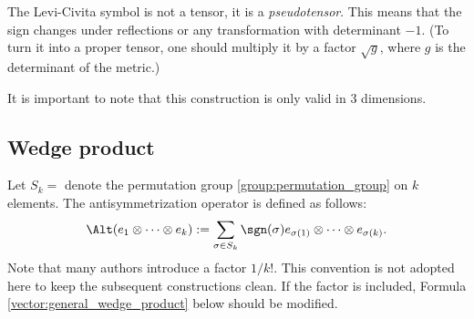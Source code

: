     \begin{remark}[Pseudotensor]\label{vector:levi_civita_pseudotensor}
        The Levi-Civita symbol is not a tensor, it is a \textit{pseudotensor}. This means that the sign changes under reflections or any transformation with determinant $-1$. (To turn it into a proper tensor, one should multiply it by a factor $\sqrt{g}$, where $g$ is the determinant of the metric.)
    \end{remark}

    \begin{remark}
        It is important to note that this construction is only valid in 3 dimensions.
    \end{remark}

\subsection{Wedge product}\label{section:wedge_product}

    \begin{definition}[Antisymmetrization]\label{vector:antisymmetrization}
        Let $S_k=$ denote the permutation group \ref{group:permutation_group} on $k$ elements. The antisymmetrization operator is defined as follows:
        \begin{gather}
            \Alt(e_1\otimes\cdots\otimes e_k) := \sum_{\sigma\in S_k} \sgn(\sigma)e_{\sigma(1)}\otimes\cdots\otimes e_{\sigma(k)}.
        \end{gather}
        Note that many authors introduce a factor $1/k!$. This convention is not adopted here to keep the subsequent constructions clean. If the factor is included, Formula \ref{vector:general_wedge_product} below should be modified.
    \end{definition}


